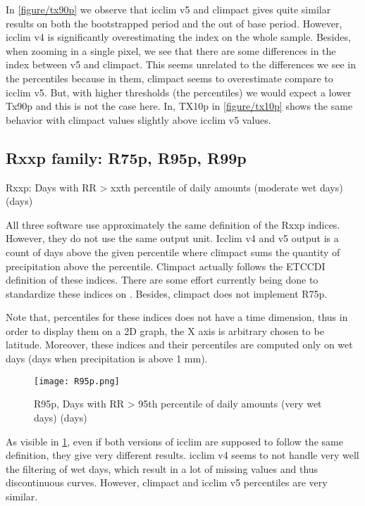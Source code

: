 \documentclass[a4paper,11pt]{article}
\begin{document}
    In \ref{figure/tx90p} we observe that icclim v5 and climpact gives quite similar results on both the bootstrapped period and the out of base period.
    However, icclim v4 is significantly overestimating the index on the whole sample.
    Besides, when zooming in a single pixel, we see that there are some differences in the index between v5 and climpact. This seems unrelated to the differences we see in the percentiles because in them, climpact seems to overestimate compare to icclim v5. But, with higher thresholds (the percentiles) we would expect a lower Tx90p and this is not the case here.
    In, TX10p in \ref{figure/tx10p} shows the same behavior with climpact values slightly above icclim v5 values.

\subsection{Rxxp family: R75p, R95p, R99p}
    Rxxp: Days with RR > xxth percentile of daily amounts (moderate wet days)(days)

    All three software use approximately the same definition of the Rxxp indices. However, they do not use the same output unit. Icclim v4 and v5 output is a count of days above the given percentile where climpact sums the quantity of precipitation above the percentile. Climpact actually follows the ETCCDI\cite{doc/etccdi} definition of these indices.
    There are some effort currently being done to standardize these indices on \cite{gh/clixmeta}.
    Besides, climpact does not implement R75p.

    Note that, percentiles for these indices does not have a time dimension, thus in order to display them on a 2D graph, the X axis is arbitrary chosen to be latitude.
    Moreover, these indices and their percentiles are computed only on wet days (days when precipitation is above 1 mm).

    \begin{figure}
        \centering
        \texttt{[image: R95p.png]}
        \caption{R95p, Days with RR > 95th percentile of daily amounts (very wet days) (days)}
        \label{figure/r95p}
    \end{figure}

    As visible in \ref{figure/r95p}, even if both versions of icclim are supposed to follow the same definition, they give very different results.
    icclim v4 seems to not handle very well the filtering of wet days, which result in a lot of missing values and thus discontinuous curves.
    However, climpact and icclim v5 percentiles are very similar.
\end{document}
